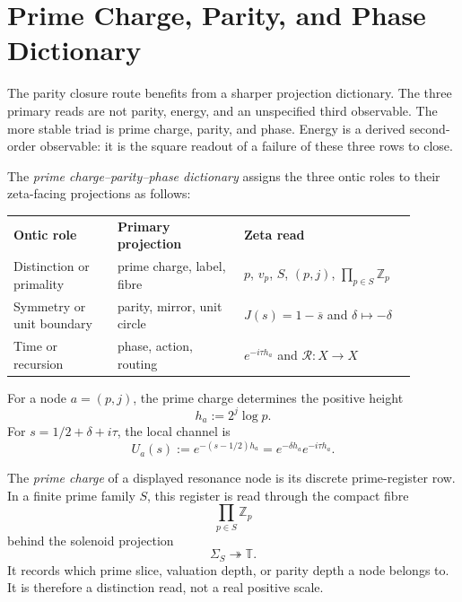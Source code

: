 \section{Prime Charge, Parity, and Phase Dictionary}
\label{sec:unified-reality-prime-charge-parity-phase-dictionary}

The parity closure route benefits from a sharper projection dictionary.
The three primary reads are not parity, energy, and an unspecified
third observable.  The more stable triad is prime charge, parity, and
phase.  Energy is a derived second-order observable: it is the square
readout of a failure of these three rows to close.

\begin{definition}
\label{def:unified-reality-prime-charge-parity-phase-projections}
The \emph{prime charge--parity--phase dictionary} assigns the three
ontic roles to their zeta-facing projections as follows:
\begin{center}
\begin{tabular}{p{0.23\linewidth}p{0.28\linewidth}p{0.38\linewidth}}
\textbf{Ontic role} & \textbf{Primary projection} & \textbf{Zeta read}\\
Distinction or primality & prime charge, label, fibre & $p$, $v_p$, $S$, $(p,j)$, $\prod_{p\in S}\mathbb Z_p$\\
Symmetry or unit boundary & parity, mirror, unit circle & $J(s)=1-\overline{s}$ and $\delta\mapsto-\delta$\\
Time or recursion & phase, action, routing & $e^{-i\tau h_a}$ and $\mathcal R:X\to X$
\end{tabular}
\end{center}
For a node $a=(p,j)$, the prime charge determines the positive height
$$
h_a:=2^j\log p.
$$
For $s=1/2+\delta+i\tau$, the local channel is
$$
U_a(s):=e^{-(s-1/2)h_a}
=
e^{-\delta h_a}e^{-i\tau h_a}.
$$
\end{definition}

\begin{definition}
\label{def:unified-reality-prime-charge}
The \emph{prime charge} of a displayed resonance node is its discrete
prime-register row.  In a finite prime family $S$, this register is read
through the compact fibre
$$
\prod_{p\in S}\mathbb Z_p
$$
behind the solenoid projection
$$
\Sigma_S\twoheadrightarrow\mathbb T.
$$
It records which prime slice, valuation depth, or parity depth a node
belongs to.  It is therefore a distinction read, not a real positive
scale.
\end{definition}

